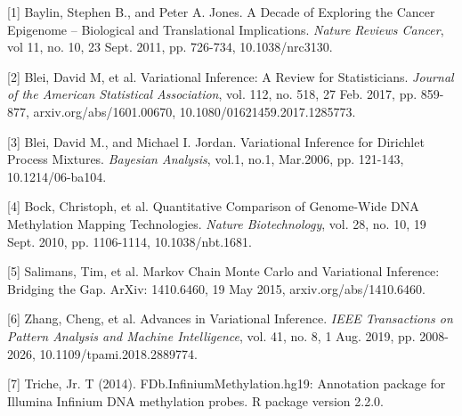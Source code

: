 \documentclass{article}
\begin{document}
\medskip
{
\small

[1] Baylin, Stephen B., and Peter A. Jones.  A Decade of Exploring the Cancer Epigenome -- Biological and Translational Implications.  {\it Nature Reviews Cancer}, vol 11, no. 10, 23 Sept. 2011, pp. 726-734, 10.1038/nrc3130.

[2] Blei, David M, et al. Variational Inference: A Review for Statisticians. {\it Journal of the American Statistical Association}, vol. 112, no. 518, 27 Feb. 2017, pp. 859-877, arxiv.org/abs/1601.00670, 10.1080/01621459.2017.1285773.

[3] Blei, David M., and Michael I. Jordan. Variational Inference for Dirichlet Process Mixtures. {\it Bayesian Analysis}, vol.1, no.1, Mar.2006, pp. 121-143, 10.1214/06-ba104.

[4] Bock, Christoph, et al. Quantitative Comparison of Genome-Wide DNA Methylation Mapping Technologies. {\it Nature Biotechnology}, vol. 28, no. 10, 19 Sept. 2010, pp. 1106-1114, 10.1038/nbt.1681.

[5] Salimans, Tim, et al.  Markov Chain Monte Carlo and Variational Inference: Bridging the Gap. ArXiv: 1410.6460, 19 May 2015, arxiv.org/abs/1410.6460.

[6] Zhang, Cheng, et al. Advances in Variational Inference. {\it IEEE Transactions on Pattern Analysis and Machine Intelligence}, vol. 41, no. 8, 1 Aug. 2019, pp. 2008-2026, 10.1109/tpami.2018.2889774.

[7] Triche, Jr. T (2014). FDb.InfiniumMethylation.hg19: Annotation package for Illumina Infinium DNA methylation probes. R package version 2.2.0.
}
\end{document}
